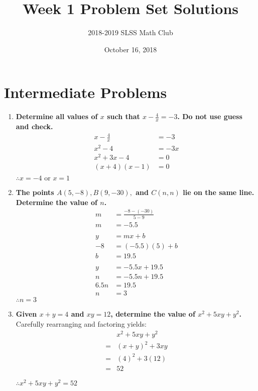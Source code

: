 \documentclass[12pt]{article}
\title{Week 1 Problem Set Solutions\vspace{-3mm}}
\author{2018-2019 SLSS Math Club\vspace{-5mm}}
\date{October 16, 2018 \vspace{-5mm}}
\begin{document}
\maketitle

\section*{Intermediate Problems}
\begin{enumerate}
    \item \textbf{Determine all values of $x$ such that $x - \frac{4}{x} = -3$. Do not use guess and check.} 
    \begin{align*}
            x-\frac{4}{x} &= -3 \\
            x^2-4 &= -3x \\
            x^2+3x-4 &= 0 \\
            (x+4)(x-1) &= 0 \\
    \end{align*}
    $\therefore x = -4 \text{ or } x = 1$
    
    \item \textbf{The points $A(5, -8), B(9, -30),$ and $C(n, n)$ lie on the same line. Determine the value of $n$.}
    \begin{align*}
        m &= \frac{-8-(-30)}{5-9} \\
        m &= -5.5 \\ \\
        y &= mx+b \\
        -8 &= (-5.5)(5)+b \\
        b &= 19.5 \\ \\
        y &= -5.5x+19.5 \\
        n &= -5.5n+19.5 \\
        6.5n &= 19.5 \\
        n &= 3
    \end{align*}
    $\therefore n = 3$
    
    \item \textbf{Given $x + y = 4$ and $xy = 12$, determine the value of $x^2 + 5xy + y^2$.} \\
    
    Carefully rearranging and factoring yields:    
    \begin{align*}
        &x^2+5xy+y^2 \\
        =& (x+y)^2+3xy \\
        =& (4)^2+3(12) \\
        =& 52
    \end{align*}
    
    $\therefore x^2 + 5xy + y^2 = 52$
    
\end{enumerate}
\newpage
\end{document}
